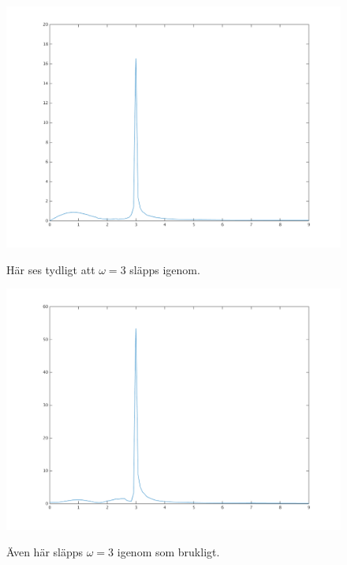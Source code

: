 \begin{figure}
    \caption{Här ses tydligt att $\omega = 3$ släpps igenom.}
    \centering
    \includegraphics[scale=0.55]{figures/task4e-fk-x-sys2.png}
    \label{fig:task4e-fk-x-sys2}
\end{figure}

\begin{figure}
    \caption{Även här släpps $\omega = 3$ igenom som brukligt.}
    \centering
    \includegraphics[scale=0.55]{figures/task4e-fk-y-sys2.png}
    \label{fig:task4e-fk-y-sys2}
\end{figure}

\clearpage

